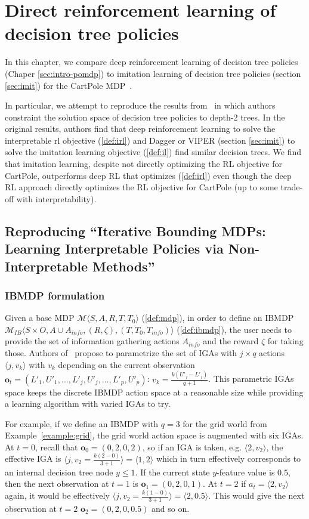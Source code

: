 \chapter{Direct reinforcement learning of decision tree policies}\label{sec:topin}
In this chapter, we compare deep reinforcement learning of decision tree policies (Chaper \ref{sec:intro-pomdp}) to imitation learning of decision tree policies (section \ref{sec:imit}) for the CartPole MDP~\cite{cartpole}.

In particular, we attempt to reproduce the results from~\cite[Table 1]{topin2021iterative} in which authors constraint the solution space of decision tree policies to depth-2 trees.
In the original results, authors find that deep reinforcement learning to solve the interpretable rl objective (\ref{def:irl}) and Dagger or VIPER (section \ref{sec:imit}) to solve the imitation learning objective (\ref{def:il}) find similar decision trees.
We find that imitation learning, despite not directly optimizing the RL objective for CartPole, outperforms deep RL that optimizes (\ref{def:irl}) even though the deep RL approach directly optimizes the RL objective for CartPole (up to some trade-off with interpretability).
\section{Reproducing ``Iterative Bounding MDPs: Learning Interpretable Policies via Non-Interpretable Methods''}

\subsection{IBMDP formulation}
Given a base MDP $\mathcal{M}\langle S, A, R, T, T_0\rangle$ (\ref{def:mdp}), in order to define an IBMDP $\mathcal{M}_{IB}\langle S\times O, A\cup A_{info}, (R, \zeta),( T, T_0, T_{info})\rangle$ (\ref{def:ibmdp}), the user needs to provide the set of information gathering actions $A_{info}$ and the reward $\zeta$ for taking those.
Authors of~\cite{topin2021iterative} propose to parametrize the set of IGAs with $j \times q$ actions $\langle j, v_k \rangle$ with $v_k$ depending on the current observation $\boldsymbol{o}_t=(L'_1, U'_1, \dots, L'_j, U'_j, \dots, L'_p, U'_p)$: $v_k = \frac{k(U'_j - L'_j)}{q+1}$.
This parametric IGAs space keeps the discrete IBMDP action space at a reasonable size while providing a learning algorithm with varied IGAs to try.

For example, if we define an IBMDP with $q=3$ for the grid world from Example~\ref{example:grid}, the grid world action space is augmented with six IGAs. 
At $t=0$, recall that $\boldsymbol{o}_0=(0, 2, 0, 2)$, so if an IGA is taken, e.g. $\langle 2, v_2\rangle$, the effective IGA is $\langle j, v_2=\frac{k(2-0)}{3+1}\rangle = \langle 1, 2 \rangle$ which in turn effectively corresponds to an internal decision tree node $y \leq 1$.
If the current state $y$-feature value is $0.5$, then the next observation at $t=1$ is $\boldsymbol{o}_1=(0, 2, 0, 1)$. At $t=2$ if $a_t=\langle 2, v_2 \rangle$ again, it would be effectively $\langle j, v_2=\frac{k(1-0)}{3+1}\rangle = \langle 2, 0.5 \rangle$. 
This would give the next observation at $t=2$ $\boldsymbol{o}_2=(0, 2, 0, 0.5)$ and so on. 

